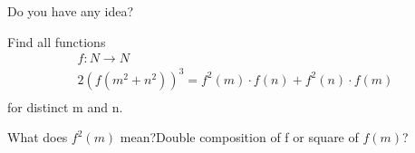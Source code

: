 \begin{solution}
	Do you have any idea?
\end{solution}



\begin{solution}
	\begin{tcolorbox}Find all functions 
\[
\begin{array}{l}
 f:N \to N \\ 
 2(f(m^2  + n^2 ))^3  = f^2 (m) \cdot f(n) + f^2 (n) \cdot f(m) \\ 
 \end{array}
\] for distinct m and n.\end{tcolorbox}
What  does $f^2 (m)$ mean?Double composition of f or square of $f(m)$?
\end{solution}



